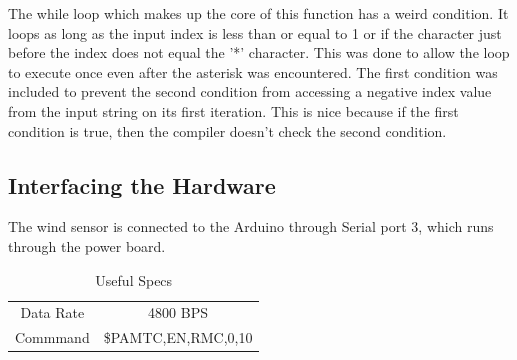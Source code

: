 \documentclass[letterpaper]{article}
\begin{document}
The while loop which makes up the core of this function has a weird condition. It loops as long as the input index is less than or equal to 1 or if the character just before the index does not equal the '*' character. This was done to allow the loop to execute once even after the asterisk was encountered. The first condition was included to prevent the second condition from accessing a negative index value from the input string on its first iteration. This is nice because if the first condition is true, then the compiler doesn't check the second condition.


\subsection{Interfacing the Hardware} %
\label{sub:Interfacing the Hardware}

The wind sensor is connected to the Arduino through Serial port 3, which runs through the power board.

\begin{table}[h]
	\centering
	\begin{tabular}{c|c}
		\hline
		Data Rate 	& 	4800 BPS 	\\
		Commmand 	& 	\$PAMTC,EN,RMC,0,10 \\
	\end{tabular}
	\caption{Useful Specs}
	\label{tbl:windspecs}
\end{table}





\nocite{*}
\end{document}
